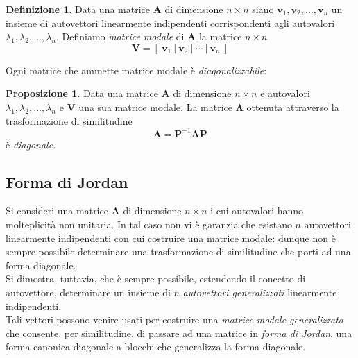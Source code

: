 \documentclass[a4paper]{article}
\renewcommand{\vec}{\bm}
\theoremstyle{definition}
\newtheorem{defn}{Definizione}[subsection]
\newtheorem{prop}{Proposizione}[subsection]
\begin{document}
			\begin{defn}
				Data una matrice $ \vec{A} $ di dimensione $ n\times n $ siano $ \vec{v}_1, \vec{v}_2, \dots, \vec{v}_n $ un insieme di autovettori linearmente indipendenti corrispondenti agli autovalori $ \lambda_1,\lambda_2,\dots,\lambda_n $. Definiamo \textit{matrice modale} di $ \vec{A} $ la matrice $ n\times n $
				\[
					\vec{V} = \left[\ \vec{v}_1\ \big|\ \vec{v}_2\ \big|\ \cdots\ \big|\ \vec{v}_n\ \right]
				\]
			\end{defn}
			
			Ogni matrice che ammette matrice modale è \textit{diagonalizzabile}:
			
			\begin{prop}
				Data una matrice $ \vec{A} $ di dimensione $ n\times n $ e autovalori $ \lambda_1,\lambda_2,\dots,\lambda_n $ e $ \vec{V} $ una sua matrice modale. La matrice $ \vec{\Lambda} $ ottenuta attraverso la trasformazione di similitudine
				\[
					\vec{\Lambda} = \vec{P}^{-1}\vec{A}\vec{P}
				\]
				è \textit{diagonale}.
			\end{prop}
			
		\subsection{Forma di Jordan}
			Si consideri una matrice $ \vec{A} $ di dimensione $ n\times n $ i cui autovalori hanno molteplicità
			non unitaria. In tal caso non vi è garanzia che esistano $ n $ autovettori linearmente indipendenti con cui costruire una matrice modale: dunque non è sempre possibile determinare una trasformazione di similitudine che porti ad una forma diagonale.\\
			Si dimostra, tuttavia, che è sempre possibile, estendendo il concetto di autovettore, determinare un insieme di $ n $ \textit{autovettori generalizzati} linearmente indipendenti.\\
			Tali vettori possono venire usati per costruire una \textit{matrice modale generalizzata} che 
			consente, per similitudine, di passare ad una matrice in \textit{forma di Jordan}, una forma
			canonica diagonale a blocchi che generalizza la forma diagonale.
			
\end{document}
